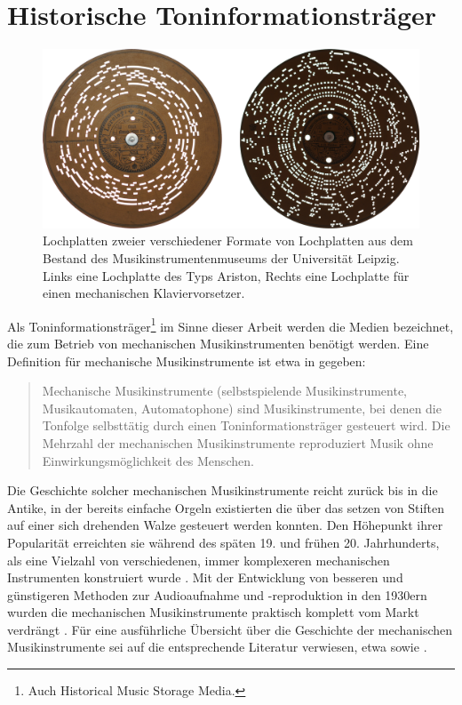 \FloatBarrier
\section{Historische Toninformationsträger}

\begin{figure}[t]
    \centering
    \includegraphics[width=\textwidth]{graphics/cardboard_plates.png}
    \caption{Lochplatten zweier verschiedener Formate von Lochplatten aus dem Bestand des Musikinstrumentenmuseums der Universität Leipzig. Links eine Lochplatte des Typs Ariston, Rechts eine Lochplatte für einen mechanischen Klaviervorsetzer.}
    \label{platten}
\end{figure}

Als Toninformationsträger\footnote{Auch Historical Music Storage Media.} im Sinne dieser Arbeit werden die Medien bezeichnet, die zum Betrieb von mechanischen Musikinstrumenten benötigt werden.
Eine Definition für mechanische Musikinstrumente ist etwa in \textcite[]{mgg_mechanische} gegeben:

\begin{quotation}
    Mechanische Musikinstrumente (selbstspielende Musikinstrumente, Musikautomaten, Automatophone) sind Musikinstrumente, bei denen die Tonfolge selbsttätig durch einen Toninformationsträger gesteuert wird. Die Mehrzahl der mechanischen Musikinstrumente reproduziert Musik ohne Einwirkungsmöglichkeit des Menschen. \parencite[I. Definition]{mgg_mechanische}
\end{quotation}

Die Geschichte solcher mechanischen Musikinstrumente reicht zurück bis in die Antike, in der bereits einfache Orgeln existierten die über das setzen von Stiften auf einer sich drehenden Walze gesteuert werden konnten.
Den Höhepunkt ihrer Popularität erreichten sie während des späten 19. und frühen 20. Jahrhunderts, als eine Vielzahl von verschiedenen, immer komplexeren mechanischen Instrumenten konstruiert wurde \parencite[10-12]{bowers_1972}.
Mit der Entwicklung von besseren und günstigeren Methoden zur Audioaufnahme und -reproduktion in den 1930ern wurden die mechanischen Musikinstrumente praktisch komplett vom Markt verdrängt \parencite[2]{zoltan_1994}.
Für eine ausführliche Übersicht über die Geschichte der mechanischen Musikinstrumente sei auf die entsprechende Literatur verwiesen, etwa \textcite[]{bowers_1972,bowers_1975} sowie \textcite[]{mgg_mechanische}.

